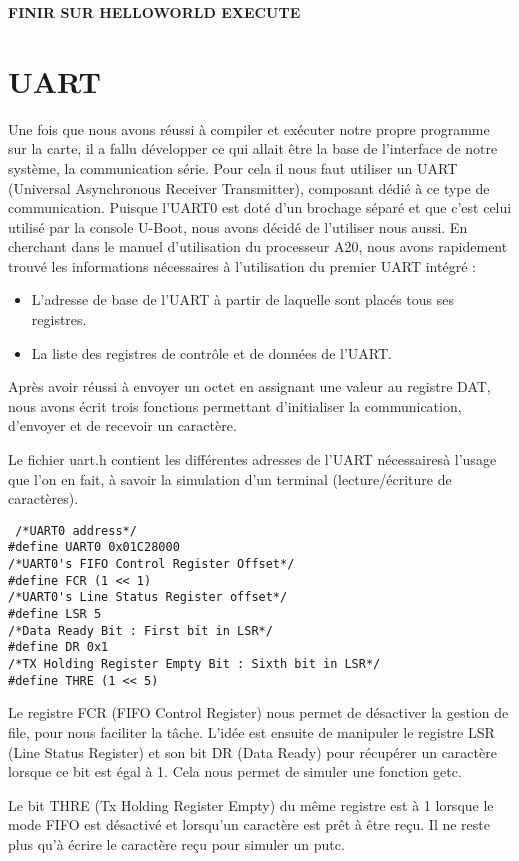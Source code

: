 \documentclass[frenchb]{article}
\begin{document}
{\Huge \textbf{FINIR SUR HELLOWORLD EXECUTE}}

\clearpage
\section{UART}
Une fois que nous avons réussi à compiler et exécuter notre propre programme sur la carte, il a fallu développer ce qui allait être la base de l'interface de notre système, la communication série.
Pour cela il nous faut utiliser un UART (Universal Asynchronous Receiver Transmitter), composant dédié à ce type de communication.
Puisque l'UART0 est doté d'un brochage séparé et que c'est celui utilisé par la console U-Boot, nous avons décidé de l'utiliser nous aussi.
En cherchant dans le manuel d'utilisation du processeur A20, nous avons rapidement trouvé les informations nécessaires à l'utilisation du premier UART intégré :
\begin{itemize}
\item L'adresse de base de l'UART à partir de laquelle sont placés tous ses registres.
\item La liste des registres de contrôle et de données de l'UART.
\end{itemize}
Après avoir réussi à envoyer un octet en assignant une valeur au registre DAT, nous avons écrit trois fonctions permettant d'initialiser la communication, d'envoyer et de recevoir un caractère.

Le fichier \textsf{uart.h} contient les différentes adresses de l'UART nécessairesà l'usage que l'on en fait, à savoir la simulation d'un terminal (lecture/écriture de caractères).

\begin{lstlisting}
 /*UART0 address*/
#define UART0 0x01C28000
/*UART0's FIFO Control Register Offset*/
#define FCR (1 << 1)
/*UART0's Line Status Register offset*/
#define LSR 5
/*Data Ready Bit : First bit in LSR*/
#define DR 0x1
/*TX Holding Register Empty Bit : Sixth bit in LSR*/
#define THRE (1 << 5)
\end{lstlisting}
\vspace*{-0.8cm}

Le registre FCR (FIFO Control Register) nous permet de désactiver la gestion de file, pour nous faciliter la tâche.
L'idée est ensuite de manipuler le registre LSR (Line Status Register) et son bit DR (Data Ready) pour récupérer un caractère lorsque ce bit est égal à 1. Cela nous permet de simuler une fonction \textsf{getc}.

 Le bit THRE (Tx Holding Register Empty) du même registre est à 1 lorsque le mode FIFO est désactivé et lorsqu'un caractère est prêt à être reçu. Il ne reste plus qu'à écrire le caractère reçu pour simuler un \textsf{putc}.
\end{document}
